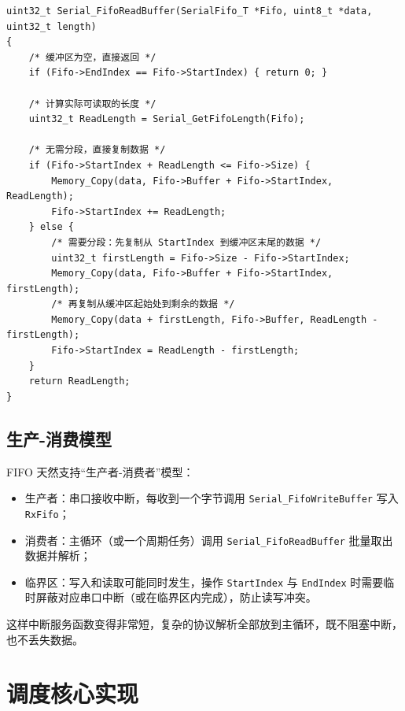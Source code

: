 \begin{lstlisting}[style=c]
uint32_t Serial_FifoReadBuffer(SerialFifo_T *Fifo, uint8_t *data, uint32_t length)
{
    /* 缓冲区为空，直接返回 */
    if (Fifo->EndIndex == Fifo->StartIndex) { return 0; }

    /* 计算实际可读取的长度 */
    uint32_t ReadLength = Serial_GetFifoLength(Fifo);

    /* 无需分段，直接复制数据 */
    if (Fifo->StartIndex + ReadLength <= Fifo->Size) {
        Memory_Copy(data, Fifo->Buffer + Fifo->StartIndex, ReadLength);
        Fifo->StartIndex += ReadLength;
    } else {
        /* 需要分段：先复制从 StartIndex 到缓冲区末尾的数据 */
        uint32_t firstLength = Fifo->Size - Fifo->StartIndex;
        Memory_Copy(data, Fifo->Buffer + Fifo->StartIndex, firstLength);
        /* 再复制从缓冲区起始处到剩余的数据 */
        Memory_Copy(data + firstLength, Fifo->Buffer, ReadLength - firstLength);
        Fifo->StartIndex = ReadLength - firstLength;
    }
    return ReadLength;
}
\end{lstlisting}

\subsection{生产-消费模型}

FIFO 天然支持“生产者-消费者”模型：

\begin{itemize}
\item 生产者：串口接收中断，每收到一个字节调用 \texttt{Serial\_FifoWriteBuffer} 写入 \texttt{RxFifo}；
\item 消费者：主循环（或一个周期任务）调用 \texttt{Serial\_FifoReadBuffer} 批量取出数据并解析；
\item 临界区：写入和读取可能同时发生，操作 \texttt{StartIndex} 与 \texttt{EndIndex} 时需要临时屏蔽对应串口中断（或在临界区内完成），防止读写冲突。
\end{itemize}

这样中断服务函数变得非常短，复杂的协议解析全部放到主循环，既不阻塞中断，也不丢失数据。

\section{调度核心实现}

